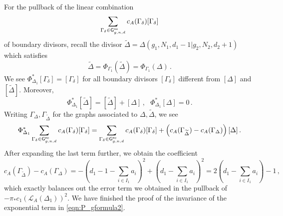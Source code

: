 \documentclass[a4paper,12pt]{article} %
\def\G{\mathsf{G}}
\theoremstyle{definition}
\theoremstyle{plain}%
\begin{document}
For the pullback of the linear combination 
\[\sum_{\Gamma_\delta \in \G_{g,n,d}^\textup{se}} c_A(\Gamma_\delta) [\Gamma_\delta]\]
of boundary divisors, recall the divisor $\widetilde \Delta = \Delta(g_1, N_1, d_1-1|g_2, N_2, d_2+1)$ which satisfies $$\widetilde \Delta = \Phi_{\Gamma_1}(\widetilde \Delta) = \Phi_{\Gamma_1}(\Delta)\, .$$
We see $\Phi_{\Delta_1}^* [\Gamma_\delta] = [\Gamma_\delta]$ for all boundary divisors $[\Gamma_\delta]$ different from $[\Delta]$ and $[\widetilde \Delta]$. Moreover,
$$\Phi_{\Delta_1}^* [\widetilde \Delta] = [\widetilde \Delta] + [\Delta]\, , \ \ \ \Phi_{\Delta_1}^* [\Delta] = 0\, .$$
Writing $\Gamma_{\Delta}, \Gamma_{\widetilde \Delta}$ for the graphs associated to $\Delta, \widetilde \Delta$, we see
\[\Phi_{\Delta_1}^* \sum_{\Gamma_\delta \in \G_{g,n,d}^\textup{se}} c_A(\Gamma_\delta) [\Gamma_\delta] = \sum_{\Gamma_\delta \in \G_{g,n,d}^\textup{se}} c_A(\Gamma_\delta) [\Gamma_\delta] + \left(c_A(\Gamma_{\widetilde \Delta}) - c_A(\Gamma_\Delta) \right) [\Delta]\,.\]
After expanding the last term further, we obtain the coefficient
\[c_A(\Gamma_{\widetilde \Delta}) - c_A(\Gamma_\Delta) = - (d_1 - 1 - \sum_{i \in I_1}a_i)^2 + (d_1  - \sum_{i \in I_1}a_i)^2 = 2 (d_1 - \sum_{i \in I_1} a_i) -1\,, \]
which exactly balances out the error term we obtained in the pullback of $- \pi_* c_1(\mathcal{L}_A(\Delta_1))^2$.
We have finished the proof of the invariance of the exponential term in \eqref{eqn:P_gformula2}.
\end{document}
